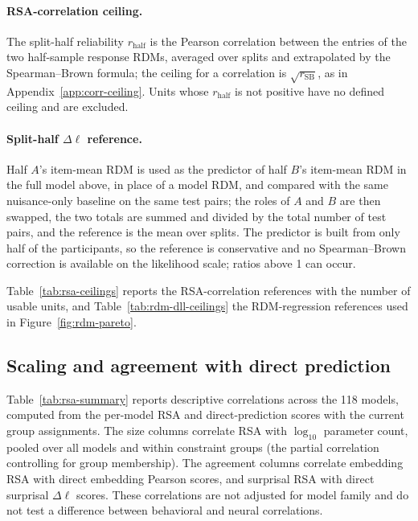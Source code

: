 \paragraph{RSA-correlation ceiling.} The split-half reliability $r_{\mathrm{half}}$ is the Pearson correlation between the entries of the two half-sample response RDMs, averaged over splits and extrapolated by the Spearman--Brown formula; the ceiling for a correlation is $\sqrt{r_{\mathrm{SB}}}$, as in Appendix~\ref{app:corr-ceiling}. Units whose $r_{\mathrm{half}}$ is not positive have no defined ceiling and are excluded.

\paragraph{Split-half $\Delta\ell$ reference.} Half $A$'s item-mean RDM is used as the predictor of half $B$'s item-mean RDM in the full model above, in place of a model RDM, and compared with the same nuisance-only baseline on the same test pairs; the roles of $A$ and $B$ are then swapped, the two totals are summed and divided by the total number of test pairs, and the reference is the mean over splits. The predictor is built from only half of the participants, so the reference is conservative and no Spearman--Brown correction is available on the likelihood scale; ratios above 1 can occur.

Table~\ref{tab:rsa-ceilings} reports the RSA-correlation references with the number of usable units, and Table~\ref{tab:rdm-dll-ceilings} the RDM-regression references used in Figure~\ref{fig:rdm-pareto}.





\subsection{Scaling and agreement with direct prediction}
\label{app:rsa-panels}

Table~\ref{tab:rsa-summary} reports descriptive correlations across the 118 models, computed from the per-model RSA and direct-prediction scores with the current group assignments. The size columns correlate RSA with $\log_{10}$ parameter count, pooled over all models and within constraint groups (the partial correlation controlling for group membership). The agreement columns correlate embedding RSA with direct embedding Pearson scores, and surprisal RSA with direct surprisal $\Delta\ell$ scores. These correlations are not adjusted for model family and do not test a difference between behavioral and neural correlations.


